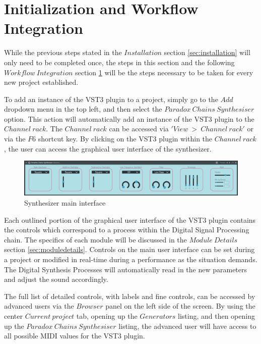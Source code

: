 \documentclass[a4paper,12pt]{report}
\begin{document}
\section{Initialization and Workflow Integration}
\label{sec:initandworkflow}
While the previous steps stated in the $Installation$ section \ref{sec:installation} will only need to be completed once, the steps in this section and the following $Workflow\ Integration$ section \ref{sec:initandworkflow} will be the steps necessary to be taken for every new project established.

To add an instance of the VST3 plugin to a project, simply go to the $Add$ dropdown menu in the top left, and then select the $Paradox\ Chains\ Synthesiser$ option. This action will automatically add an instance of the VST3 plugin to the $Channel\ rack$. The $Channel\ rack$ can be accessed via $'View\ >\ Channel\ rack'$ or via the $F6$ shortcut key. By clicking on the VST3 plugin within the $Channel\ rack$, the user can access the graphical user interface of the synthesizer.

\begin{figure} \centering
\includegraphics[width=36em]{SynthesiserMainGUI.png}
    \caption{Synthesizer main interface}     \label{fig:synthmaininterface} \end{figure}


Each outlined portion of the graphical user interface of the VST3 plugin contains the controls which correspond to a process within the Digital Signal Processing chain. The specifics of each module will be discussed in the $Module\ Details$ section \ref{sec:moduledetails}. Controls on the main user interface can be set during a project or modified in real-time during a performance as the situation demands. The Digital Synthesis Processes will automatically read in the new parameters and adjust the sound accordingly.

The full list of detailed controls, with labels and fine controls, can be accessed by advanced users via the $Browser$ panel on the left side of the screen. By using the center $Current\ project$ tab, opening up the $Generators$ listing, and then opening up the $Paradox\ Chains\ Synthesiser$ listing, the advanced user will have access to all possible MIDI values for the VST3 plugin.
\end{document}

